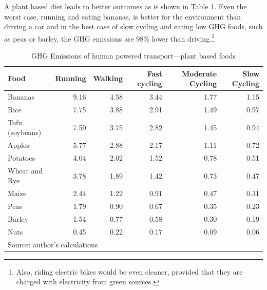 \documentclass{article}[12pt,letterpaper]
\begin{document}
A plant based diet leads to better outcomes as is shown in Table \ref{tab:table_co2_eq_100_km_veggies}. Even the worst case, running and eating bananas, is better for the environment than driving a car and in the best case of slow cycling and eating low GHG foods, such as peas or barley, the GHG emissions are 98\% lower than driving.\footnote{Also, riding electric bikes would be even cleaner, provided that they are charged with electricity from green sources.}
\begin{table}[ht]
  \begin{center}
    \caption{GHG Emissions of human powered transport---plant based foods}
    \label{tab:table_co2_eq_100_km_veggies}
    \begin{tabular}{l|r|r|r|r|r}
      \hline
      Food	&	Running	&	Walking	&	Fast cycling	&	Moderate Cycling	&	Slow  Cycling	\\
      \hline
      Bananas	&	9.16	&	4.58	&	3.44	&	1.77	&	1.15	\\
      Rice	&	7.75	&	3.88	&	2.91	&	1.49	&	0.97	\\
      Tofu (soybeans)	&	7.50	&	3.75	&	2.82	&	1.45	&	0.94	\\
      Apples	&	5.77	&	2.88	&	2.17	&	1.11	&	0.72	\\
      Potatoes	&	4.04	&	2.02	&	1.52	&	0.78	&	0.51	\\
      Wheat and Rye	&	3.78	&	1.89	&	1.42	&	0.73	&	0.47	\\
      Maize	&	2.44	&	1.22	&	0.91	&	0.47	&	0.31	\\
      Peas	&	1.79	&	0.90	&	0.67	&	0.35	&	0.23	\\
      Barley	&	1.54	&	0.77	&	0.58	&	0.30	&	0.19	\\
      Nuts	&	0.45	&	0.22	&	0.17	&	0.09	&	0.06	\\
      \hline
      \multicolumn{6}{l}{Source: author's calculations}      
    \end{tabular}
  \end{center}
\end{table}
\end{document}
